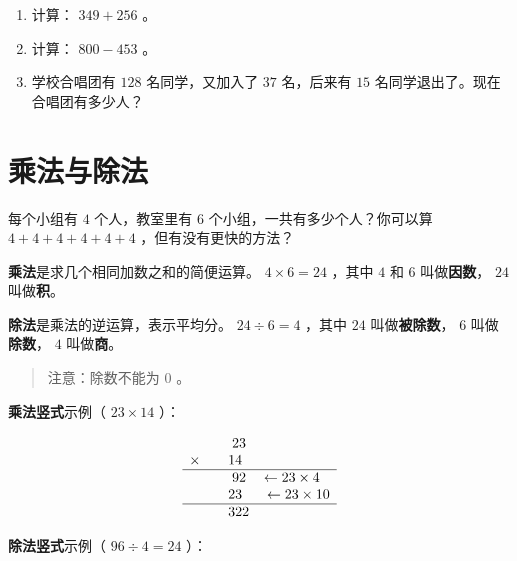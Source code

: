 \begin{practice}


\begin{enumerate}
  \item 计算： $349 + 256$ 。
  \item 计算： $800 - 453$ 。
  \item 学校合唱团有 $128$ 名同学，又加入了 $37$ 名，后来有 $15$ 名同学退出了。现在合唱团有多少人？
\end{enumerate}


\end{practice}

\section*{乘法与除法}


\begin{explore}


每个小组有 $4$ 个人，教室里有 $6$ 个小组，一共有多少个人？你可以算 $4 + 4 + 4 + 4 + 4 + 4$ ，但有没有更快的方法？

\end{explore}

\begin{understand}


\textbf{乘法}是求几个相同加数之和的简便运算。 $4 \times 6 = 24$ ，其中 $4$ 和 $6$ 叫做\textbf{因数}， $24$ 叫做\textbf{积}。

\textbf{除法}是乘法的逆运算，表示平均分。 $24 \div 6 = 4$ ，其中 $24$ 叫做\textbf{被除数}， $6$ 叫做\textbf{除数}， $4$ 叫做\textbf{商}。

\end{understand}

\begin{quote}
注意：除数不能为 $0$ 。
\end{quote}


\textbf{乘法竖式}示例（ $23 \times 14$ ）：

\[
\begin{array}{rl}
&\phantom{\times}23 \\
\times\enspace&\phantom{0}14 \\
\hline
&\phantom{\times}92 \quad \leftarrow 23 \times 4 \\
&\phantom{0}23\phantom{0} \quad \leftarrow 23 \times 10 \\
\hline
&\phantom{0}322
\end{array}
\]


\textbf{除法竖式}示例（ $96 \div 4 = 24$ ）：

